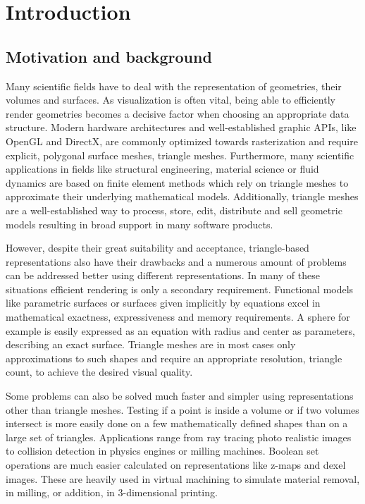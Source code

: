 \chapter{Introduction}
\label{ch:introduction}

\section{Motivation and background}
\label{sec:motivation}

Many scientific fields have to deal with the representation of geometries, their volumes and surfaces.
As visualization is often vital, being able to efficiently render geometries becomes a decisive factor when choosing an appropriate data structure.
Modern hardware architectures and well-established graphic APIs, like OpenGL and DirectX, are commonly optimized towards rasterization and require explicit, polygonal surface meshes, \eg triangle meshes.
Furthermore, many scientific applications in fields like structural engineering, material science or fluid dynamics are based on finite element methods which rely on triangle meshes to approximate their underlying mathematical models.
Additionally, triangle meshes are a well-established way to process, store, edit, distribute and sell geometric models resulting in broad support in many software products.


However, despite their great suitability and acceptance, triangle-based representations also have their drawbacks and a numerous amount of problems can be addressed better using different representations. %
In many of these situations efficient rendering is only a secondary requirement.
Functional models like parametric surfaces or surfaces given implicitly by equations excel in mathematical exactness, expressiveness and memory requirements.
A sphere for example is easily expressed as an equation with radius and center as parameters, describing an exact surface.
Triangle meshes are in most cases only approximations to such shapes and require an appropriate resolution, \ie triangle count, to achieve the desired visual quality.

Some problems can also be solved much faster and simpler using representations other than triangle meshes.
Testing if a point is inside a volume or if two volumes intersect is more easily done on a few mathematically defined shapes than on a large set of triangles.
Applications range from ray tracing photo realistic images to collision detection in physics engines or milling machines.
Boolean set operations are much easier calculated on representations like z-maps and dexel images.
These are heavily used in virtual machining to simulate material removal, \eg in milling, or addition, \eg in 3-dimensional printing.


